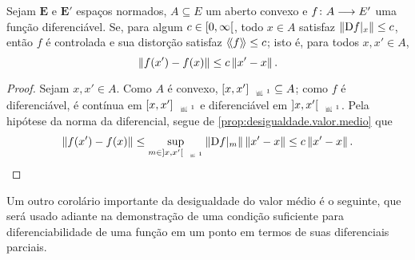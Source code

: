 \begin{proposition}
\label{prop:diferencial.limitada.funcao.controlada}
Sejam $\bm E$ e $\bm E'$ espaços normados, $A \subseteq E$ um aberto convexo e $f\colon \allowbreak A \longrightarrow E'$ uma função diferenciável. Se, para algum $c \in \left[0,\allowbreak \infty\right[$, todo $x \in A$ satisfaz $\left\Vert{\mathrm{D}f|_x}\right\Vert \leq c$, então $f$ é controlada e sua distorção satisfaz $\langle\!\langle{f}\rangle\!\rangle \leq c$; isto é, para todos $x,x' \in A$,
	\begin{equation*}
	\left\Vert{f(x') - f(x)}\right\Vert \leq c \left\Vert{x'-x}\right\Vert.
	\end{equation*}
\end{proposition}
\begin{proof}
Sejam $x,x' \in A$. Como $A$ é convexo, $\Sxger{x,x'} \subseteq A$; como $f$ é diferenciável, é contínua em $\Sxger{x,x'}$ e diferenciável em $\Sxgera{x,x'}$. Pela hipótese da norma da diferencial, segue de \ref{prop:desigualdade.valor.medio} que
	\begin{equation*}
	\nor{f(x') - f(x)} \leq \sup_{m \in \Sxgera{x,x'}} \nor{\D f|_m} \nor{x'-x} \leq c\nor{x'-x}.
	\qedhere
	\end{equation*}
\end{proof}

Um outro corolário importante da desigualdade do valor médio é o seguinte, que será usado adiante na demonstração de uma condição suficiente para diferenciabilidade de uma função em um ponto em termos de suas diferenciais parciais.

